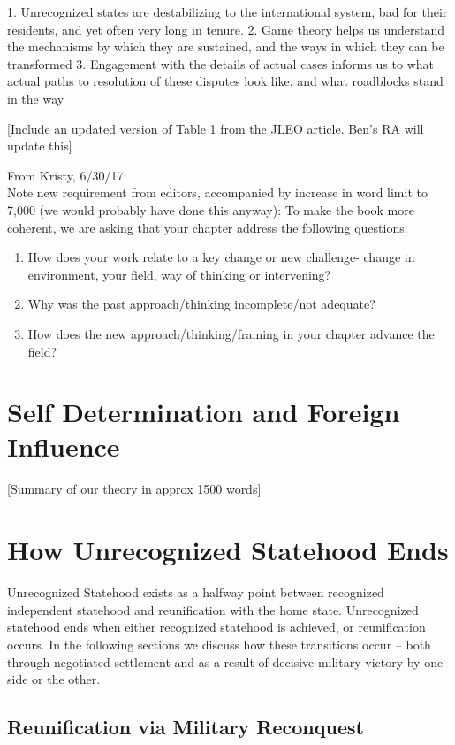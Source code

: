 \documentclass[12pt,letterpaper, notitlepage]{article}
\begin{document}
1. Unrecognized states are destabilizing to the international system, bad for their residents, and yet often very long in tenure.
2. Game theory helps us understand the mechanisms by which they are sustained, and the ways in which they can be transformed
3. Engagement with the details of actual cases informs us to what actual paths to resolution of these disputes look like, and what roadblocks stand in the way


[Include an updated version of Table 1 from the JLEO article. Ben's RA will update this]

From Kristy, 6/30/17:\\
Note new requirement from editors, accompanied by increase in word limit to 7,000 (we would probably have done this anyway):
To make the book  more coherent, we are asking that your chapter address the following questions:
\begin{enumerate}
	\item How does your work relate to a key change or  new challenge- change in environment, your field, way of thinking or intervening?
	\item Why was the past approach/thinking incomplete/not adequate?
	\item How does the new approach/thinking/framing in your chapter advance the field?
\end{enumerate} 



\section*{Self Determination and Foreign Influence}
[Summary of our theory in approx 1500 words]

\section*{How Unrecognized Statehood Ends}

Unrecognized Statehood exists as a halfway point between recognized independent statehood and reunification with the home state. Unrecognized statehood ends when either recognized statehood is achieved, or reunification occurs.  In the following sections we discuss how these transitions occur -- both through negotiated settlement and as a result of decisive military victory by one side or the other.  

\subsection*{Reunification via Military Reconquest}
\end{document}
